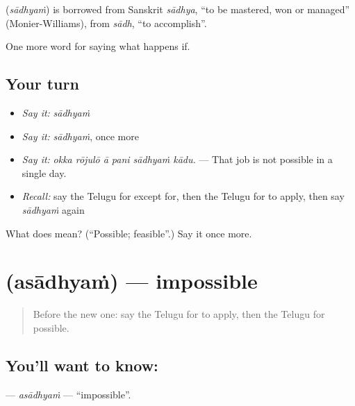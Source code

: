 \begin{cousinweb}
\textbf{} (\emph{sādhyaṁ}) is borrowed from Sanskrit \emph{sādhya}, \textquotedblleft{}to be mastered, won or managed\textquotedblright{} (Monier-Williams), from \emph{sādh}, \textquotedblleft{}to accomplish\textquotedblright{}.
\end{cousinweb}

\begin{grammarlens}[title={What you've built}]
One more word for saying what happens if.
\end{grammarlens}

\subsection*{Your turn}
\begin{itemize}
\raggedright
  \item \emph{Say it:} \emph{sādhyaṁ}
  \item \emph{Say it:} \emph{sādhyaṁ}, once more
  \item \emph{Say it:} \emph{okka rōjulō ā pani sādhyaṁ kādu.} — That job is not possible in a single day.
  \item \emph{Recall:} say the Telugu for except for, then the Telugu for to apply, then say \emph{sādhyaṁ} again
\end{itemize}

\begin{tcolorbox}[breakable,colback=teal!4,colframe=teal!35!black,title={Before you move on}]
What does  mean? (\textquotedblleft{}Possible; feasible\textquotedblright{}.) Say it once more.
\end{tcolorbox}
\section[\texorpdfstring{\te{అసాధ్యం} (asādhyaṁ)}{అసాధ్యం (asādhyaṁ)}]{ (asādhyaṁ) — impossible}

\label{lesson:TE-C418-asadhyam}



\begin{quote}
Before the new one: say the Telugu for to apply, then the Telugu for possible.
\end{quote}

\subsection*{You'll want to know: }
\textbf{} — \emph{asādhyaṁ} — \textquotedblleft{}impossible\textquotedblright{}.

